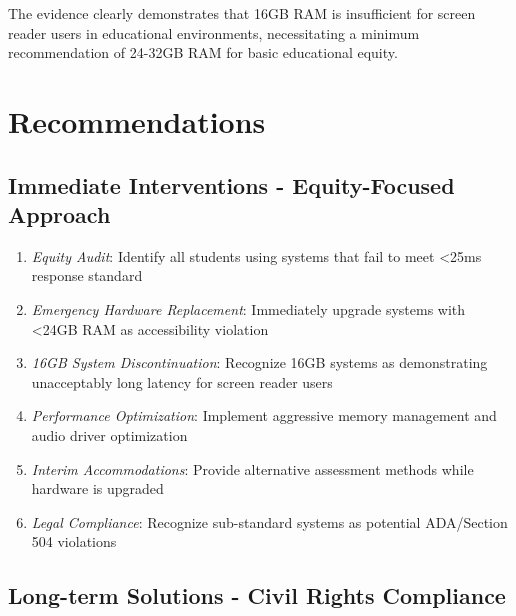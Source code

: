 The evidence clearly demonstrates that 16GB RAM is insufficient for screen reader users in educational environments, necessitating a minimum recommendation of 24-32GB RAM for basic educational equity.

\pagebreak

\hypertarget{recommendations}{}\section{Recommendations}\label{recommendations}

\subsection{Immediate Interventions - Equity-Focused Approach}\label{immediate-interventions-equity-focused-approach}

\begin{enumerate}
\item \emph{Equity Audit}: Identify all students using systems that fail to meet <25ms response standard
\item \emph{Emergency Hardware Replacement}: Immediately upgrade systems with <24GB RAM as accessibility violation
\item \emph{16GB System Discontinuation}: Recognize 16GB systems as demonstrating unacceptably long latency for screen reader users
\item \emph{Performance Optimization}: Implement aggressive memory management and audio driver optimization
\item \emph{Interim Accommodations}: Provide alternative assessment methods while hardware is upgraded
\item \emph{Legal Compliance}: Recognize sub-standard systems as potential ADA/Section 504 violations
\end{enumerate}

\subsection{Long-term Solutions - Civil Rights Compliance}\label{long-term-solutions-civil-rights-compliance}

